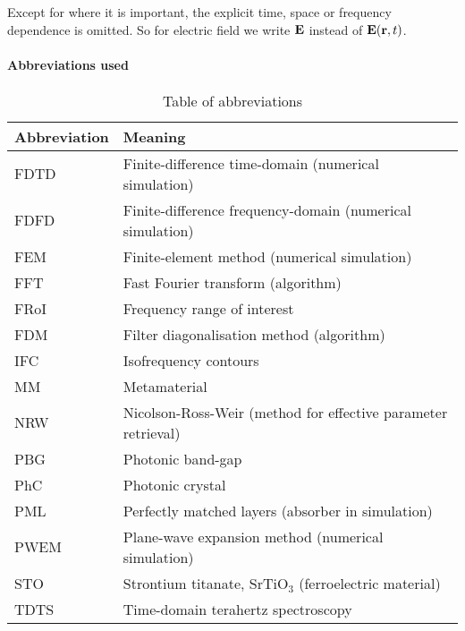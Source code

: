 Except for where it is important, the explicit time, space or frequency dependence is omitted. So for electric field we write $\mathbf{E}$ instead of $\mathbf{E}({\mathbf{r}},t)$.

\paragraph{Abbreviations used} %
\begin{table}[ht]   \caption{Table of abbreviations}  \label{tb_shortcuts} \centering 
\begin{tabular}{ll}
 \toprule
Abbreviation & Meaning	\\
 \hline
FDTD 		& Finite-difference time-domain (numerical simulation)\\
FDFD 		& Finite-difference frequency-domain (numerical simulation)\\
FEM 		& Finite-element method (numerical simulation)\\
FFT 		& Fast Fourier transform (algorithm)\\
FRoI 		& Frequency range of interest\\
FDM 		& Filter diagonalisation method (algorithm)\\
IFC			& Isofrequency contours\\
MM			& Metamaterial\\
NRW 		& Nicolson-Ross-Weir (method for effective parameter retrieval)\\
PBG			& Photonic band-gap\\
PhC 		& Photonic crystal\\
PML 		& Perfectly matched layers (absorber in simulation)\\
PWEM 		& Plane-wave expansion method (numerical simulation)\\
STO			& Strontium titanate, SrTiO$_3$ (ferroelectric material)\\
TDTS 		& Time-domain terahertz spectroscopy\\
 \bottomrule
 \end{tabular} \end{table}

